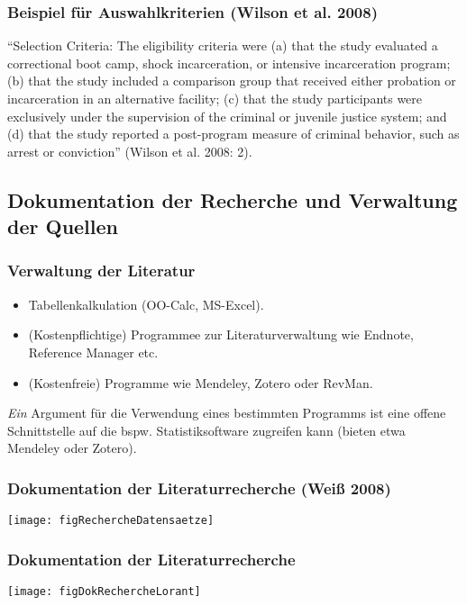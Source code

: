     \begin{frame}
      \frametitle{Beispiel für Auswahlkriterien (Wilson et al. 2008)}
      "`Selection Criteria: The eligibility criteria were (a) that the study
      evaluated a correctional boot camp, shock incarceration, or intensive
      incarceration program; (b) that the study included a comparison group that
      received either probation or incarceration in an alternative facility; (c)
      that the study participants were exclusively under the supervision of the
      criminal or juvenile justice system; and (d) that the study reported a
      post-program measure of criminal behavior, such as arrest or conviction"'
      (Wilson et al. 2008: 2).
    \end{frame}




\subsection{Dokumentation der Recherche und Verwaltung der Quellen}

\begin{frame}
  \frametitle{Verwaltung der Literatur}
  \begin{itemize}[<+->]
  \item Tabellenkalkulation (OO-Calc, MS-Excel).
  \item (Kostenpflichtige) Programmee zur Literaturverwaltung wie Endnote,
    Reference Manager etc.
  \item (Kostenfreie) Programme wie Mendeley, Zotero oder RevMan.
  \end{itemize}
  \emph{Ein} Argument für die Verwendung eines bestimmten Programms ist eine
  offene Schnittstelle auf die bspw. Statistiksoftware zugreifen kann (bieten
  etwa Mendeley oder Zotero).
\end{frame}


\begin{frame}[plain]
  \frametitle{Dokumentation der Literaturrecherche (Weiß 2008)}
  \begin{center}
    \texttt{[image: figRechercheDatensaetze]}
  \end{center}
\end{frame}


\begin{frame}[plain]
  \frametitle{Dokumentation der Literaturrecherche \citep{lorant_socioeconomic_2003}}
  \begin{center}
    \texttt{[image: figDokRechercheLorant]}  
  \end{center}
\end{frame}


